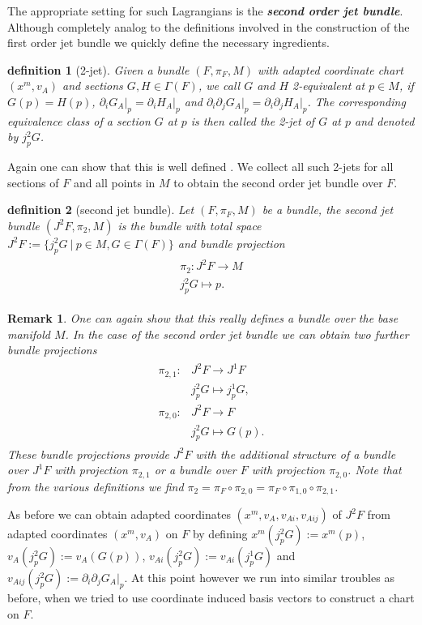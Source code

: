 \documentclass[a4paper,12pt, DIV=14, BCOR=5mm, twoside, headsepline]{scrbook}
\newtheorem{definition}{definition}[section]
\newtheorem*{remark}{Remark}
\begin{document}
The appropriate setting for such Lagrangians is the \textbf{\textit{second order jet bundle}}. Although completely analog to the definitions involved in the construction of the first order jet bundle we quickly define the necessary ingredients. 
\begin{definition}[2-jet]
Given a bundle $(F, \pi_F, M)$ with adapted coordinate chart $(x^m, v_A)$ and sections $G,H \in \Gamma(F)$, we call $G$ and $H$ 2-equivalent at $p \in M$, if $G(p) = H(p)$, $\partial_i G_A \vert_p = \partial_i H_A \vert_p$ and $\partial_i \partial_j G_A \vert_ p = \partial_i \partial_j H_A \vert_ p $. The corresponding equivalence class of a section $G$ at $p$ is then called the 2-jet of $G$ at $p$ and denoted by $j^2_pG$.
\end{definition}
Again one can show that this is well defined \cite{saunders_1989}. We collect all such 2-jets for all sections of $F$ and all points in $M$ to obtain the second order jet bundle over $F$.
\begin{definition}[second jet bundle]
Let $(F, \pi_F, M)$ be a bundle, the second jet bundle $(J^2F,\pi_2,M)$ is the bundle with total space $J^2F := \{j^2_pG \  \vert \  p \in M, G \in \Gamma(F)\}$ and bundle projection 
\begin{align}
    \begin{aligned}
\pi_2 : J^2F \longrightarrow M \\
j^2_pG \longmapsto p.
    \end{aligned}
\end{align}
\end{definition}
\begin{remark}
One can again show that this really defines a bundle over the base manifold $M$. In the case of the second order jet bundle we can obtain two further bundle projections 
\begin{align}
    \begin{aligned}
    \pi_{2,1} : &J^2F \longrightarrow J^1F \\
    &j^2_pG \longmapsto j^1_pG ,\\
    \pi_{2,0} : &J^2F \longrightarrow F \\
    &j^2_pG \longmapsto G(p).
    \end{aligned}
\end{align}
These bundle projections provide $J^2F$ with the additional structure of a bundle over $J^1F$ with projection $\pi_{2,1}$ or a bundle over $F$ with projection $\pi_{2,0}$. Note that from the various definitions we find $\pi_{2} = \pi_F \circ \pi_{2,0} = \pi_F \circ \pi_{1,0} \circ \pi_{2,1}$.
\end{remark}
As before we can obtain adapted coordinates $(x^m, v_A, v_{Ai},v_{Aij})$ of $J^2F$ from adapted coordinates $(x^m,v_A)$ on $F$ by defining $x^m(j^2_pG) := x^m(p)$, $v_A(j^2_pG):= v_A(G(p))$, $v_{Ai}(j^2_pG) := v_{Ai}(j^1_pG)$ and $v_{Aij}(j^2_pG) := \partial_i \partial_j G_A \vert _p$. 
At this point however we run into similar troubles as before, when we tried to use coordinate induced basis vectors to construct a chart on $F$. 
\end{document}
